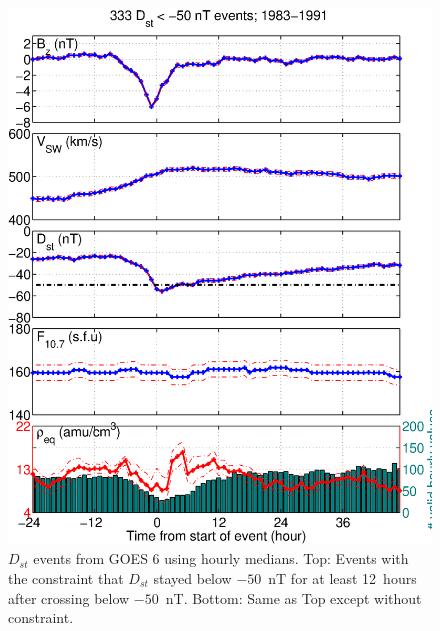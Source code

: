 \documentclass[12pt]{article}
\begin{document}
\begin{figure}[tp!]
\includegraphics[scale=0.40]{figures/stormavs-dst-GOES6.eps}
\caption{$D_{st}$ events from GOES 6 using hourly medians. Top: Events with the constraint that $D_{st}$ stayed below $-50$~nT for at least 12~hours after crossing below $-50$~nT.  Bottom: Same as Top except without constraint.}
\label{fig:HourlyAveragedDstEvents}
\end{figure}
\end{document}
